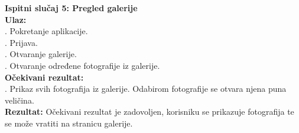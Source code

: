 \documentclass[times, utf8, zavrsni]{fer}
\begin{document}
		\noindent \textbf{Ispitni slučaj 5: Pregled galerije}\\
			\textbf{Ulaz:}\\
			    . Pokretanje aplikacije.\\
			    . Prijava.\\
			    . Otvaranje galerije.\\
			    . Otvaranje određene fotografije iz galerije.\\
			   
			\noindent\textbf{Očekivani rezultat:}\\
			    . Prikaz svih fotografija iz galerije. Odabirom fotografije se otvara njena puna veličina.\\
			    
			\noindent\textbf{Rezultat:}
			    \noindent Očekivani rezultat je zadovoljen, korisniku se prikazuje fotografija te se može vratiti na stranicu galerije.
			    
\end{document}
